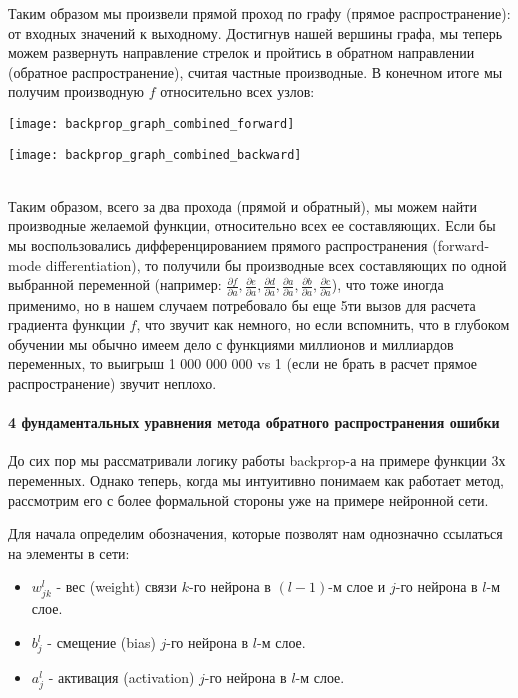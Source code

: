 Таким образом мы произвели прямой проход по графу (прямое распространение): 
от входных значений к выходному. Достигнув нашей вершины графа, мы 
теперь можем развернуть направление стрелок и пройтись в обратном направлении 
(обратное распространение), считая частные производные. В конечном итоге мы получим 
производную $f$ относительно всех узлов:

\begin{minipage}{0.45\textwidth}
    \texttt{[image: backprop\_graph\_combined\_forward]}
    \label{fig:backprop_graph_combined_forward}
\end{minipage}
\hfill
\begin{minipage}{0.45\textwidth}
    \texttt{[image: backprop\_graph\_combined\_backward]}
    \label{fig:backprop_graph_combined_backward}
\end{minipage}\\

Таким образом, всего за два прохода (прямой и обратный), мы можем 
найти производные желаемой функции, относительно всех ее составляющих. 
Если бы мы воспользовались дифференцированием прямого распространения 
(forward-mode differentiation), то получили бы производные всех составляющих 
по одной выбранной переменной (например: 
$\frac{\partial f}{\partial a}, \frac{\partial e}{\partial a}, 
\frac{\partial d}{\partial a}, \frac{\partial a}{\partial a}, 
\frac{\partial b}{\partial a}, \frac{\partial c}{\partial a}$), 
что тоже иногда применимо, но в нашем случаем потребовало бы еще 5ти вызов 
для расчета градиента функции $f$, что звучит как немного, но если 
вспомнить, что в глубоком обучении мы обычно имеем дело с функциями 
миллионов и миллиардов переменных, то выигрыш 1 000 000 000 vs 1 (если не брать в расчет 
прямое распространение) звучит неплохо.

\paragraph{4 фундаментальных уравнения метода обратного распространения ошибки}

До сих пор мы рассматривали логику работы backprop-а на примере функции 
3х переменных. Однако теперь, когда мы интуитивно понимаем как работает метод, 
рассмотрим его с более формальной стороны уже на примере нейронной сети. 

Для начала определим обозначения, которые позволят нам однозначно ссылаться на 
элементы в сети:
\begin{itemize}
    \item $w_{jk}^l$ - вес (weight) связи $k$-го нейрона в $(l-1)$-м слое и $j$-го нейрона в $l$-м слое.
    \item $b_j^l$ - смещение (bias) $j$-го нейрона в $l$-м слое.
    \item $a_j^l$ - активация (activation) $j$-го нейрона в $l$-м слое.
\end{itemize}

